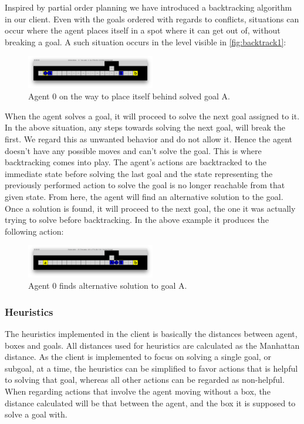 \documentclass[Main]{subfiles}
\begin{document}
Inspired by partial order planning we have introduced a backtracking algorithm in our client. Even with the goals ordered with regards to conflicts, situations can occur where the agent places itself in a spot where it can get out of, without breaking a goal. A such situation occurs in the level visible in \autoref{fig:backtrack1}:
\begin{figure}[h!]
    \centering
    \includegraphics[width=0.5\textwidth]{backtrack1.png}
    \caption{Agent 0 on the way to place itself behind solved goal A.}
    \label{fig:backtrack1}
\end{figure}

When the agent solves a goal, it will proceed to solve the next goal assigned to it. In the above situation, any steps towards solving the next goal, will break the first. We regard this as unwanted behavior and do not allow it. Hence the agent doesn't have any possible moves and can't solve the goal. This is where backtracking comes into play. The agent's actions are backtracked to the immediate state before solving the last goal and the state representing the previously performed action to solve the goal is no longer reachable from that given state. From here, the agent will find an alternative solution to the goal. Once a solution is found, it will proceed to the next goal, the one it was actually trying to solve before backtracking. In the above example it produces the following action:
\begin{figure}[h!]
    \centering
    \includegraphics[width=0.5\textwidth]{backtrack2.png}
    \caption{Agent 0 finds alternative solution to goal A.}
    \label{fig:backtrack2}
\end{figure}



\subsubsection{Heuristics}
\label{sec:method_heuristics}
The heuristics implemented in the client is basically the distances between agent, boxes and goals. All distances used for heuristics are calculated as the Manhattan distance.  As the client is implemented to focus on solving a single goal, or subgoal, at a time, the heuristics can be simplified to favor actions that is helpful to solving that goal, whereas all other actions can be regarded as non-helpful. 
When regarding actions that involve the agent moving without a box, the distance calculated will be that between the agent, and the box it is supposed to solve a goal with. 
\end{document}
